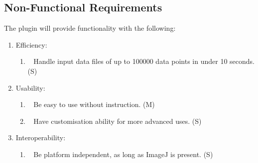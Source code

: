 \subsection{Non-Functional Requirements}
\label{sub:non_functional_requirements}

The plugin will provide functionality with the following:

\begin{enumerate}[label=\arabic*.]
	\item Efficiency:
		\begin{enumerate}[label*=\arabic*.]
			\item~\label{req:o} Handle input data files of up to \num{100000}
				data points in under 10 seconds. (S)
		\end{enumerate}
	\item Usability:
		\begin{enumerate}[label*=\arabic*.]
			\item~\label{req:p} Be easy to use without instruction. (M)
			\item~\label{req:q} Have customisation ability for more advanced
				uses. (S)
		\end{enumerate}
	\item Interoperability:
		\begin{enumerate}[label*=\arabic*.]
			\item~\label{req:r} Be platform independent, as long as ImageJ is
				present. (S)
		\end{enumerate}
\end{enumerate}

\restoregeometry%
